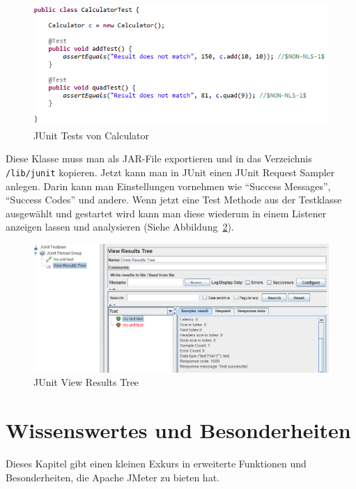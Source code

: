 \documentclass[a4paper,12pt]{article}
\newcommand{\codeInLine}[1]{%
\colorbox{graybackgroundColor}{\lstinline{#1}} %
}
\begin{document}
		\begin{figure}[htb]%
 \centering
    \includegraphics[width=1\textwidth]{bilder/calculator_test.png}
  \caption{JUnit Tests von Calculator}
  \label{fig:calculator_test}
\end{figure}

Diese Klasse muss man als JAR-File exportieren und in das Verzeichnis \codeInLine{/lib/junit} kopieren. Jetzt kann man in JUnit einen JUnit Request Sampler anlegen. Darin kann man Einstellungen vornehmen wie "`Success Messages"', "`Success Codes"' und andere. Wenn jetzt eine Test Methode aus der Testklasse ausgewählt und gestartet wird kann man diese wiederum in einem Listener anzeigen lassen und analysieren (Siehe Abbildung~\ref{fig:calculator_test_jmeter}).

	\begin{figure}[htb]%
 \centering
    \includegraphics[width=1\textwidth]{bilder/calculator_test_jmeter.png}
  \caption{JUnit View Results Tree}
  \label{fig:calculator_test_jmeter}
\end{figure}

\section{Wissenswertes und Besonderheiten}
\label{sec:wissenswertes}
Dieses Kapitel gibt einen kleinen Exkurs in erweiterte Funktionen und Besonderheiten, die Apache JMeter zu bieten hat.
\end{document}
